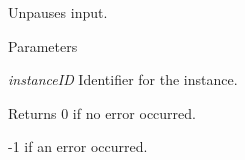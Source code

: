 Unpauses input. 


\begin{DoxyParams}{Parameters}
\item[{\em instanceID}]Identifier for the instance.\end{DoxyParams}
\begin{DoxyReturn}{Returns}
0 if no error occurred. 

-\/1 if an error occurred. 
\end{DoxyReturn}

